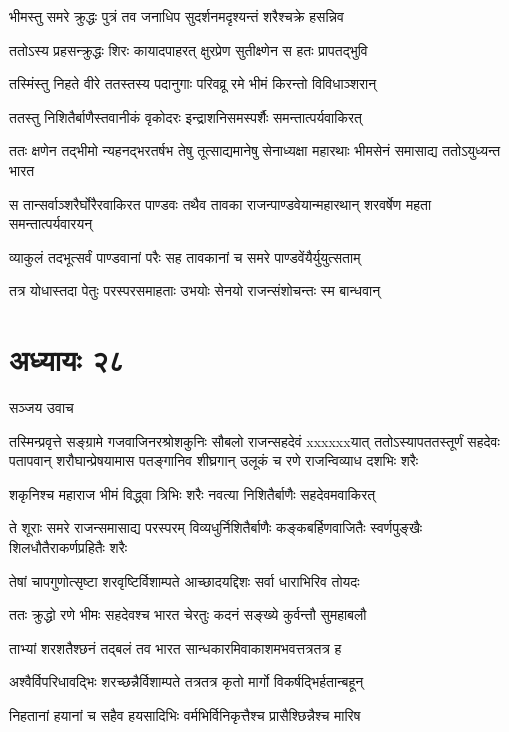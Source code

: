 \twolineshloka
{भीमस्तु समरे क्रुद्धः पुत्रं तव जनाधिप}
{सुदर्शनमदृश्यन्तं शरैश्चक्रे हसन्निव}


\twolineshloka
{ततोऽस्य प्रहसन्क्रुद्धः शिरः कायादपाहरत्}
{क्षुरप्रेण सुतीक्ष्णेन स हतः प्रापतद्भुवि}


\twolineshloka
{तस्मिंस्तु निहते वीरे ततस्तस्य पदानुगाः}
{परिवव्रू रमे भीमं किरन्तो विविधाञ्शरान्}


\twolineshloka
{ततस्तु निशितैर्बाणैस्तवानीकं वृकोदरः}
{इन्द्राशनिसमस्पर्शैः समन्तात्पर्यवाकिरत्}


ततः क्षणेन तद्भीमो न्यहनद्भरतर्षभ
\twolineshloka
{तेषु तूत्साद्यमानेषु सेनाध्यक्षा महारथाः}
{भीमसेनं समासाद्य ततोऽयुध्यन्त भारत}


\threelineshloka
{स तान्सर्वाञ्शरैर्घोरैरवाकिरत पाण्डवः}
{तथैव तावका राजन्पाण्डवेयान्महारथान्}
{शरवर्षेण महता समन्तात्पर्यवारयन्}


\twolineshloka
{व्याकुलं तदभूत्सर्वं पाण्डवानां परैः सह}
{तावकानां च समरे पाण्डवेंयैर्युयुत्सताम्}


\twolineshloka
{तत्र योधास्तदा पेतुः परस्परसमाहताः}
{उभयोः सेनयो राजन्संशोचन्तः स्म बान्धवान्}


\chapter{अध्यायः २८}
\twolineshloka
{सञ्जय उवाच}
{}


तस्मिन्प्रवृत्ते सङ्ग्रामे गजवाजिनरश्रोशकुनिः सौबलो राजन्सहदेवं xxxxxxयात्
\threelineshloka
{ततोऽस्यापततस्तूर्णं सहदेवः पतापवान्}
{शरौघान्प्रेषयामास पतङ्गानिव शीघ्रगान्}
{उलूकं च रणे राजन्विव्याध दशभिः शरैः}


\twolineshloka
{शकृनिश्च महाराज भीमं विद्ध्वा त्रिभिः शरैः}
{नवत्या निशितैर्बाणैः सहदेवमवाकिरत्}


\threelineshloka
{ते शूराः समरे राजन्समासाद्य परस्परम्}
{विव्यधुर्निशितैर्बाणैः कङ्कबर्हिणवाजितैः}
{स्वर्णपुङ्खैः शिलधौतैराकर्णप्रहितैः शरैः}


\twolineshloka
{तेषां चापगुणोत्सृष्टा शरवृष्टिर्विशाम्पते}
{आच्छादयद्दिशः सर्वा धाराभिरिव तोयदः}


\twolineshloka
{ततः क्रुद्धो रणे भीमः सहदेवश्च भारत}
{चेरतुः कदनं सङ्ख्ये कुर्वन्तौ सुमहाबलौ}


\twolineshloka
{ताभ्यां शरशतैश्छनं तद्बलं तव भारत}
{सान्धकारमिवाकाशमभवत्तत्रतत्र ह}


\twolineshloka
{अश्वैर्विपरिधावद्भिः शरच्छन्नैर्विशाम्पते}
{तत्रतत्र कृतो मार्गो विकर्षद्भिर्हतान्बहून्}


\twolineshloka
{निहतानां हयानां च सहैव हयसादिभिः}
{वर्मभिर्विनिकृत्तैश्च प्रासैश्छिन्नैश्च मारिष}


